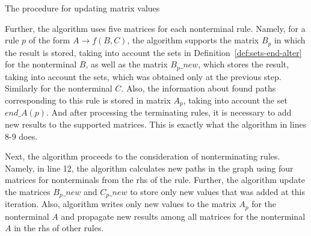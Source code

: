 \begin{algorithm}[H]
\footnotesize
\begin{algorithmic}[1]
\caption{The procedure for updating matrix values}
\label{lst:algo2}

    \EndFor
            
    \EndFor
    \EndFor
    
    \EndFor

    \EndFor
    \EndFor
\EndProcedure

\end{algorithmic}
\end{algorithm}

Further, the algorithm uses five matrices for each nonterminal rule. Namely, for a rule $p$ of the form $A \rightarrow f(B, C)$, the algorithm supports the matrix $B_p$ in which the result is stored, taking into account the sets in Definition~\ref{def:sets-end-alter} for the nonterminal $B$, as well as the matrix $B_p\_new$, which stores the result, taking into account the sets, which was obtained only at the previous step. Similarly for the nonterminal $C$. Also, the information about found paths corresponding to this rule is stored in matrix $A_p$, taking into account the set $end\_A(p)$. And after processing the terminating rules, it is necessary to add new results to the supported matrices. This is exactly what the algorithm in lines 8-9 does.

Next, the algorithm proceeds to the consideration of nonterminating rules. Namely, in line 12, the algorithm calculates new paths in the graph using four matrices for nonterminals from the rhs of the rule. Further, the algorithm update the matrices $B_p\_new$ and $C_p\_new$ to store only new values that was added at this iteration. Also, algorithm writes only new values to the matrix $A_p$ for the nonterminal $A$ and propagate new results among all matrices for the nonterminal $A$ in the rhs of other rules. 

